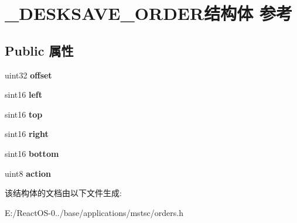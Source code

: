 \hypertarget{struct___d_e_s_k_s_a_v_e___o_r_d_e_r}{}\section{\+\_\+\+D\+E\+S\+K\+S\+A\+V\+E\+\_\+\+O\+R\+D\+E\+R结构体 参考}
\label{struct___d_e_s_k_s_a_v_e___o_r_d_e_r}
\subsection*{Public 属性}
\begin{DoxyCompactItemize}
\item 
\mbox{\label{struct___d_e_s_k_s_a_v_e___o_r_d_e_r_ad4ca2b85c6e8933602a37870e23c6bcd}} 
uint32 {\bfseries offset}
\item 
\mbox{\label{struct___d_e_s_k_s_a_v_e___o_r_d_e_r_a8ad8f57f46925bb70475d4ef1d0e8325}} 
sint16 {\bfseries left}
\item 
\mbox{\label{struct___d_e_s_k_s_a_v_e___o_r_d_e_r_a081ba856c0987189bb7472bcd728811a}} 
sint16 {\bfseries top}
\item 
\mbox{\label{struct___d_e_s_k_s_a_v_e___o_r_d_e_r_a8d0ec21e13125f05d3272171210b9199}} 
sint16 {\bfseries right}
\item 
\mbox{\label{struct___d_e_s_k_s_a_v_e___o_r_d_e_r_af1c455e01745bba1641e66aeecb96b58}} 
sint16 {\bfseries bottom}
\item 
\mbox{\label{struct___d_e_s_k_s_a_v_e___o_r_d_e_r_a114453816c3783c8b973983adb47c76a}} 
uint8 {\bfseries action}
\end{DoxyCompactItemize}


该结构体的文档由以下文件生成\+:\begin{DoxyCompactItemize}
\item 
E\+:/\+React\+O\+S-\/0../base/applications/mstsc/orders.\+h\end{DoxyCompactItemize}
